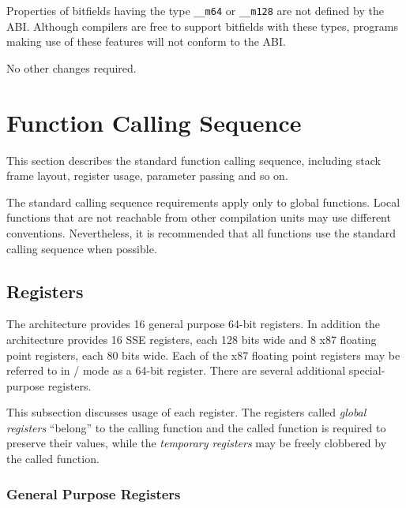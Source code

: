 Properties of bitfields having the type \texttt{__m64} or
\texttt{__m128} are not defined by the ABI.  Although compilers are
free to support bitfields with these types, programs making use of
these features will not conform to the \xARCH ABI.

No other changes required.

\section{Function Calling Sequence}

This section describes the standard function calling sequence,
including stack frame layout, register usage, parameter passing and so
on.

The standard calling sequence requirements apply only to global
functions.  Local functions that are not reachable from other
compilation units may use different conventions.  Nevertheless, it is
recommended that all functions use the standard calling sequence when
possible.

\subsection{Registers}
\label{subsec-registers}

The \xARCH architecture provides 16 general purpose 64-bit registers.
In addition the architecture provides 16 SSE registers, each 128 bits
wide and 8 x87 floating point registers, each 80 bits wide.  Each of
the x87 floating point registers may be referred to in \MMX/\threednow
mode as a 64-bit register.  There are several additional
special-purpose registers.

This subsection discusses usage of each register.  The registers called
\emph{global registers} ``belong'' to the calling function and the called function
is required to preserve their values, while the \emph{temporary registers} may
be freely clobbered by the called function.

\subsubsection {General Purpose Registers}

